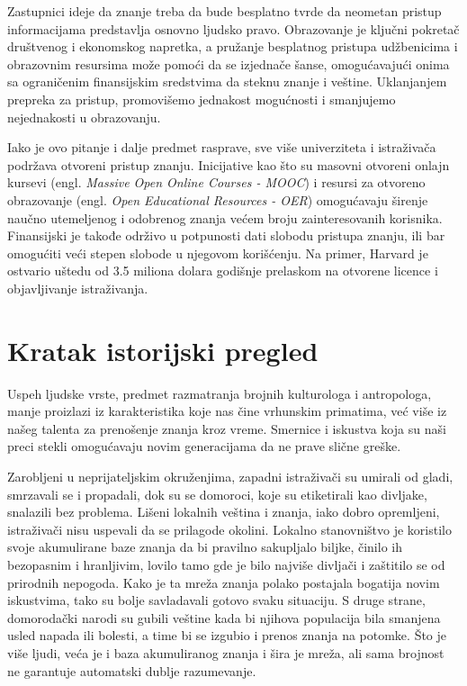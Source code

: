 \documentclass{article}
\begin{document}
Zastupnici ideje da znanje treba da bude besplatno tvrde da neometan pristup informacijama predstavlja osnovno ljudsko pravo. Obrazovanje je ključni pokretač društvenog i ekonomskog napretka, a pružanje besplatnog pristupa udžbenicima i obrazovnim resursima može pomoći da se izjednače šanse, omogućavajući onima sa ograničenim finansijskim sredstvima da steknu znanje i veštine. Uklanjanjem prepreka za pristup, promovišemo jednakost mogućnosti i smanjujemo nejednakosti u obrazovanju.

Iako je ovo pitanje i dalje predmet rasprave, sve više univerziteta i istraživača podržava otvoreni pristup znanju. Inicijative kao što su masovni otvoreni onlajn kursevi (engl. \textit{Massive Open Online Courses - MOOC}) i resursi za otvoreno obrazovanje (engl. \textit{Open Educational Resources - OER}) omogućavaju širenje naučno utemeljenog i odobrenog znanja većem broju zainteresovanih korisnika. Finansijski je takođe održivo u potpunosti dati slobodu pristupa znanju, ili bar omogućiti veći stepen slobode u njegovom korišćenju. Na primer, Harvard je ostvario uštedu od 3.5 miliona dolara godišnje prelaskom na otvorene licence i objavljivanje istraživanja\cite{knowledge23}.


\section{Kratak istorijski pregled}

Uspeh ljudske vrste, predmet razmatranja brojnih kulturologa i antropologa, manje proizlazi iz karakteristika koje nas čine vrhunskim primatima, već više iz našeg talenta za prenošenje znanja kroz vreme. Smernice i iskustva koja su naši preci stekli omogućavaju novim generacijama da ne prave slične greške\cite{wrangham2019goodness}.

Zarobljeni u neprijateljskim okruženjima, zapadni istraživači su umirali od gladi, smrzavali se i propadali, dok su se domoroci, koje su etiketirali kao divljake, snalazili bez problema. Lišeni lokalnih veština i znanja, iako dobro opremljeni, istraživači nisu uspevali da se prilagode okolini. Lokalno stanovništvo je koristilo svoje akumulirane baze znanja da bi pravilno sakupljalo biljke, činilo ih bezopasnim i hranljivim, lovilo tamo gde je bilo najviše divljači i zaštitilo se od prirodnih nepogoda. Kako je ta mreža znanja polako postajala bogatija novim iskustvima, tako su bolje savladavali gotovo svaku situaciju. S druge strane, domorodački narodi su gubili veštine kada bi njihova populacija bila smanjena usled napada ili bolesti, a time bi se izgubio i prenos znanja na potomke. Što je više ljudi, veća je i baza akumuliranog znanja i šira je mreža, ali sama brojnost ne garantuje automatski dublje razumevanje.
\end{document}
